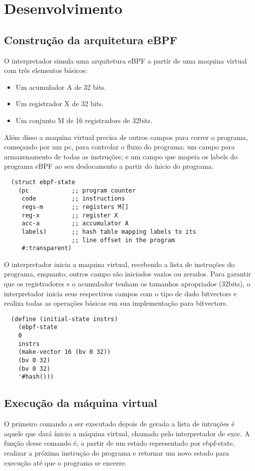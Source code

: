 \documentclass[paper=a4, fontsize=12pt]{article}
\theoremstyle{definition}
\begin{document}
\section{Desenvolvimento}
\subsection{Construção da arquitetura eBPF}

O interpretador simula uma arquitetura eBPF a partir de uma maquina virtual com três
elementos básicos:
\begin{itemize}
\item Um acumulador A de 32 bits.
\item Um registrador X de 32 bits.
\item Um conjunto M de 16 registradors de 32bits.
\end{itemize}

Além disso a maquina virtual precisa de outros campos para correr o programa, começando
por um pc, para controlar o fluxo do programa; um campo para armazenamento de todas as 
instruções; e um campo que mapeia os labels do programa eBPF ao seu deslocamento a partir
do ínicio do programa.

\begin{lstlisting}
  (struct ebpf-state
    (pc            ;; program counter
     code          ;; instructions
     regs-m        ;; registers M[]
     reg-x         ;; register X
     acc-a         ;; accumulator A
     labels)       ;; hash table mapping labels to its
                   ;; line offset in the program
     #:transparent)
\end{lstlisting}

O interpretador inicia a maquina virtual, recebendo a lista de instruções do programa,
enquanto, outros campo são iniciados vazios ou zerados.
Para garantir que os registradores e o acumulador tenham os tamanhos apropriados (32bits),
o interpretador inicia seus respectivos campos com o tipo de dado bitvectors e realiza
todas as operações básicas em sua implementação para bitvectors.  

\begin{lstlisting}
  (define (initial-state instrs)
    (ebpf-state
    0
    instrs
    (make-vector 16 (bv 0 32))
    (bv 0 32)
    (bv 0 32)
    '#hash()))
\end{lstlisting}

\subsection{Execução da máquina virtual}
O primeiro comando a ser executado depois de gerada a lista de intruções é aquele que dará
ínicio a máquina virtual, chamado pelo interpretador de exec. A função desse comando é, a partir de
um estado representado por ebpf-state, realizar a próxima instrução do programa e retornar um novo
estado para execução até que o programa se encerre. 
\end{document}
